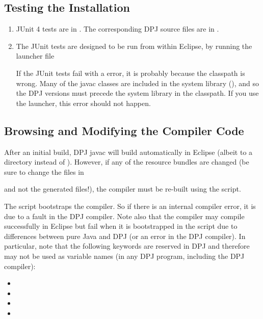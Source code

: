 \subsection{Testing the Installation%
\label{sec:testing}}
\begin{enumerate}
\item JUnit 4 tests are in
  .  The
  corresponding DPJ source files are in .
\item The JUnit tests are designed to be run from within Eclipse, by
  running the launcher file
%
%
If the JUnit tests fail with a  error, it is
probably because the classpath is wrong.  Many of the javac classes
are included in the system library (), and so the DPJ
versions must precede the system library in the classpath.  If you use
the launcher, this error should not happen.
\end{enumerate}

\subsection{Browsing and Modifying the Compiler Code}

After an initial  build, DPJ javac will build automatically
in Eclipse (albeit to a  directory instead of ).
However, if any of the resource bundles are changed (be sure to change
the  files in
%
\begin{description}
\item {} 
\end{description}
and not the generated  files!), the compiler must be
re-built using the  script.
 
The  script bootstraps the compiler.  So if there is an
internal compiler error, it is due to a fault in the DPJ compiler.
Note also that the compiler may compile successfully in Eclipse but
fail when it is bootstrapped in the  script due to differences
between pure Java and DPJ (or an error in the DPJ compiler).  In
particular, note that the following keywords are reserved in DPJ and
therefore may not be used as variable names (in any DPJ program,
including the DPJ compiler):
\begin{itemize}
     \item {}
     \item {}
     \item {}
     \item {}
\end{itemize}



